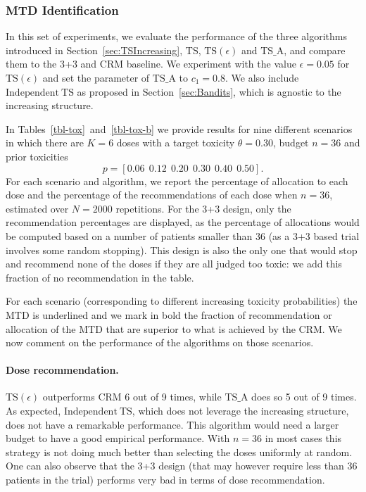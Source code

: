 \subsubsection{MTD Identification}

In this set of experiments, we evaluate the performance of the three algorithms introduced in Section~\ref{sec:TSIncreasing}, $\mathrm{TS}$, $\mathrm{TS}(\epsilon)$ and $\mathrm{TS}\_\mathrm{A}$, and compare them to the 3+3 and $\mathrm{CRM}$ baseline. We experiment with the value $\epsilon = 0.05$ for $\mathrm{TS}(\epsilon)$ and set the parameter of $\mathrm{TS}\_\mathrm{A}$ to $c_1 = 0.8$. We also include $\mathrm{Independent \ TS}$ as proposed in Section~\ref{sec:Bandits}, which is agnostic to the increasing structure. 
 
In Tables~\ref{tbl-tox}~and~\ref{tbl-tox-b} we provide results for nine different scenarios in which there are $K=6$ doses with a target toxicity $\theta = 0.30$, budget $n=36$ and prior toxicities\[p = [0.06 \ \ 0.12 \ \ 0.20 \ \ 0.30 \ \ 0.40 \ \ 0.50].\]
For each scenario and algorithm, we report the percentage of allocation to each dose and the percentage of the recommendations of each dose when $n=36$, estimated over $N=2000$ repetitions. For the 3+3 design, only the recommendation percentages are displayed, as the percentage of allocations would be computed based on a number of patients smaller than 36 (as a 3+3 based trial involves some random stopping). This design is also the only one that would stop and recommend none of the doses if they are all judged too toxic: we add this fraction of no recommendation in the table. 

\medskip

For each scenario (corresponding to different increasing toxicity probabilities) the MTD is underlined
and we mark in bold the fraction of recommendation or allocation of the MTD that are superior to what is achieved by the CRM. We now comment on the performance of the algorithms on those scenarios.

\paragraph{Dose recommendation.}  $\mathrm{TS}(\epsilon)$ outperforms CRM 6 out of 9 times, while $\mathrm{TS}\_\mathrm{A}$ does so 5 out of 9 times. As expected, $\mathrm{Independent \ TS}$, which does not leverage the increasing structure, does not have a remarkable performance. This algorithm would need a larger budget to have a good empirical performance. With $n=36$ in most cases this strategy is not doing much better than selecting the doses uniformly at random. One can also observe that the 3+3 design (that may however require less than 36 patients in the trial) performs very bad in terms of dose recommendation.

